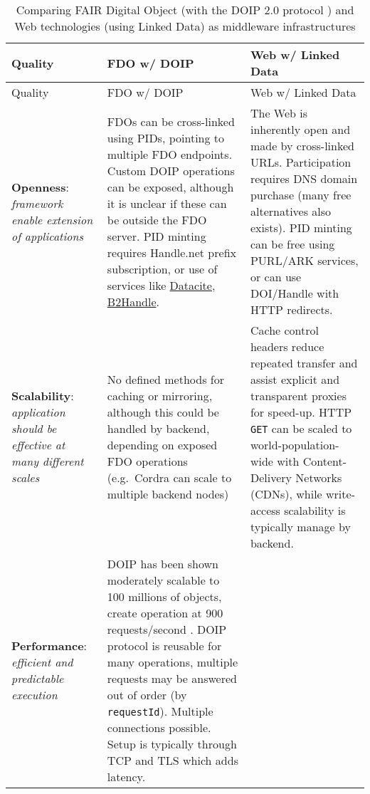 \begin{landscape}
\begin{small}
\begin{longtable}[]{@{}
  >{\raggedright\arraybackslash}p{}
  >{\raggedright\arraybackslash}p{}
  >{\raggedright\arraybackslash}p{}@{}}
	\caption[Comparing FAIR Digital Object and Web technologies as middleware infrastructures]{Comparing FAIR Digital Object (with the DOIP 2.0 protocol \cite{foundationDigitalObjectInterface}) and Web technologies (using Linked Data) as middleware infrastructures \cite{zarrasComparisonFrameworkMiddleware2004a}
\label{tbl:fdo-web-middleware}}\tabularnewline
\toprule
Quality & 
FDO w/ DOIP & 
Web w/ Linked Data \\
\midrule
\endfirsthead
\toprule
Quality & 
FDO w/ DOIP & 
Web w/ Linked Data \\
\midrule
\endhead
\textbf{Openness}: \emph{framework enable extension of applications}
  & FDOs can be cross-linked using PIDs, pointing to multiple FDO endpoints. Custom DOIP operations can be exposed, although it is unclear if these can be outside the FDO server. PID minting requires Handle.net prefix subscription, or use of services like \href{https://datacite.org/}{Datacite}, \href{https://eudat.eu/services/userdoc/b2handle}{B2Handle}.
  & The Web is inherently open and made by cross-linked URLs. Participation requires DNS domain purchase (many free alternatives also exists). PID minting can be free using PURL/ARK services, or can use DOI/Handle with HTTP redirects. \\
\textbf{Scalability}: \emph{application should be effective at many different scales}
  & No defined methods for caching or mirroring, although this could be handled by backend, depending on exposed FDO operations (e.g.~Cordra can scale to multiple backend nodes)
  & Cache control headers reduce repeated transfer and assist explicit and transparent proxies for speed-up. HTTP \texttt{GET} can be scaled to world-population-wide with Content-Delivery Networks (CDNs), while write-access scalability is typically manage by backend. \\
\textbf{Performance}: \emph{efficient and predictable execution}
  & DOIP has been shown moderately scalable to 100 millions of objects, create operation at 900 requests/second . DOIP protocol is reusable for many operations, multiple requests may be answered out of order (by \texttt{requestId}). Multiple connections possible. Setup is typically through TCP and TLS which adds latency.

\end{longtable}
\end{small}
\end{landscape}
